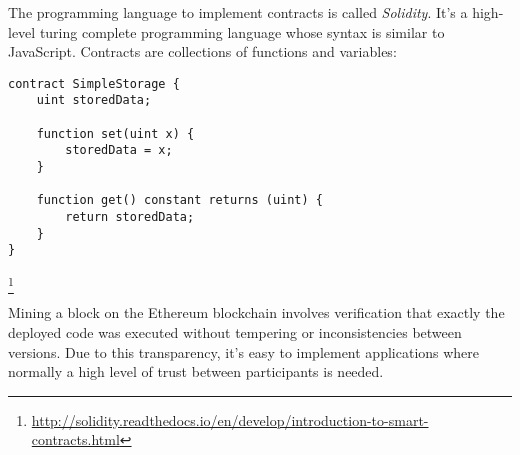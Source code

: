 The programming language to implement contracts is called \textit{Solidity}. It's a high-level turing complete programming language whose syntax is similar to JavaScript. Contracts are collections of functions and variables:

\begin{lstlisting}
contract SimpleStorage {
    uint storedData;

    function set(uint x) {
        storedData = x;
    }

    function get() constant returns (uint) {
        return storedData;
    }
}
\end{lstlisting}\footnote{\url{http://solidity.readthedocs.io/en/develop/introduction-to-smart-contracts.html}}


Mining a block on the Ethereum blockchain involves verification that exactly the deployed code was executed without tempering or inconsistencies between versions. Due to this transparency, it's easy to implement applications where normally a high level of trust between participants is needed.